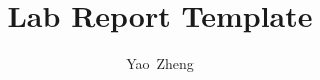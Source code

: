 \documentclass[12pt]{report}
\begin{document}
\title{Lab Report Template}

\author{Yao~Zheng}%

\maketitle

\begin{acronym}

\end{acronym}

\printbibliography[heading=none]
\end{document}
